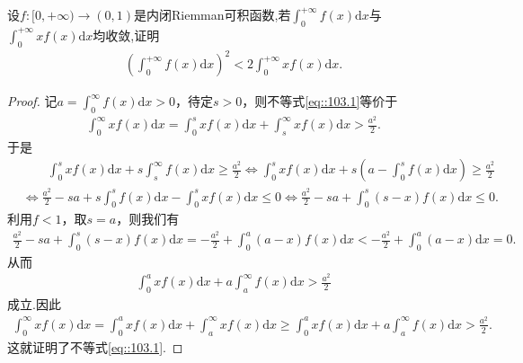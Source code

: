 \documentclass[../../main.tex]{subfiles}%
\begin{document}
\begin{example}
设$f:[0,+\infty)\to (0,1)$是内闭Riemman可积函数,若$\int_0^{+\infty} f(x) \mathrm{d}x$与$\int_0^{+\infty} x f(x) \mathrm{d}x$均收敛,证明
\begin{align}
\left( \int_0^{+\infty} f(x) \mathrm{d}x \right)^2 < 2 \int_0^{+\infty} x f(x) \mathrm{d}x.\label{eq::103.1}
\end{align}
\end{example}
\begin{proof}
记$a=\int_0^{\infty} f(x) \mathrm{d}x>0$，待定$s>0$，则不等式\eqref{eq::103.1}等价于
\begin{align*}
\int_0^{\infty} x f(x) \mathrm{d}x = \int_0^s x f(x) \mathrm{d}x + \int_s^{\infty} x f(x) \mathrm{d}x > \frac{a^2}{2}.
\end{align*}
于是
\begin{align*}
&\quad \quad \int_0^s x f(x) \mathrm{d}x + s \int_s^{\infty} f(x) \mathrm{d}x \geqslant \frac{a^2}{2} \Longleftrightarrow \int_0^s x f(x) \mathrm{d}x + s \left( a - \int_0^s f(x) \mathrm{d}x \right) \geqslant \frac{a^2}{2} \\
&\Longleftrightarrow \frac{a^2}{2} - sa + s \int_0^s f(x) \mathrm{d}x - \int_0^s x f(x) \mathrm{d}x \leqslant 0 \Longleftrightarrow \frac{a^2}{2} - sa + \int_0^s (s - x) f(x) \mathrm{d}x \leqslant 0.
\end{align*}
利用$f<1$，取$s=a$，则我们有
\begin{align*}
\frac{a^2}{2} - sa + \int_0^s (s - x) f(x) \mathrm{d}x = -\frac{a^2}{2} + \int_0^a (a - x) f(x) \mathrm{d}x < -\frac{a^2}{2} + \int_0^a (a - x) \mathrm{d}x = 0.
\end{align*}
从而
\begin{align*}
\int_0^a x f(x) \mathrm{d}x + a \int_a^{\infty} f(x) \mathrm{d}x > \frac{a^2}{2}
\end{align*}
成立.因此
\begin{align*}
\int_0^{\infty} x f(x) \mathrm{d}x = \int_0^a x f(x) \mathrm{d}x + \int_a^{\infty} x f(x) \mathrm{d}x \geqslant \int_0^a x f(x) \mathrm{d}x + a \int_a^{\infty} f(x) \mathrm{d}x > \frac{a^2}{2}.
\end{align*}
这就证明了不等式\eqref{eq::103.1}.
\end{proof}
\end{document}
